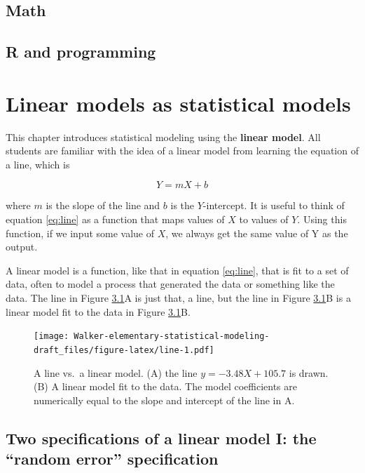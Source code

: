 \documentclass[]{book}
\begin{document}
\section{Math}\label{math}

\section{R and programming}\label{r-and-programming}

\chapter{Linear models as statistical
models}\label{linear-models-as-statistical-models}

This chapter introduces statistical modeling using the \textbf{linear
model}. All students are familiar with the idea of a linear model from
learning the equation of a line, which is

\begin{equation}
Y = mX + b
\label{eq:line}
\end{equation}

where \(m\) is the slope of the line and \(b\) is the \(Y\)-intercept.
It is useful to think of equation \eqref{eq:line} as a function that maps
values of \(X\) to values of \(Y\). Using this function, if we input
some value of \(X\), we always get the same value of Y as the output.

A linear model is a function, like that in equation \eqref{eq:line}, that
is fit to a set of data, often to model a process that generated the
data or something like the data. The line in Figure \ref{fig:line}A is
just that, a line, but the line in Figure \ref{fig:line}B is a linear
model fit to the data in Figure \ref{fig:line}B.

\begin{figure}
\centering
\texttt{[image: Walker-elementary-statistical-modeling-draft\_files/figure-latex/line-1.pdf]}
\caption{\label{fig:line}A line vs.~a linear model. (A) the line
\(y=-3.48X + 105.7\) is drawn. (B) A linear model fit to the data. The
model coefficients are numerically equal to the slope and intercept of
the line in A.}
\end{figure}

\section{\texorpdfstring{Two specifications of a linear model I: the
``random error''
specification}{Two specifications of a linear model I: the random error specification}}\label{two-specifications-of-a-linear-model-i-the-random-error-specification}
\end{document}
